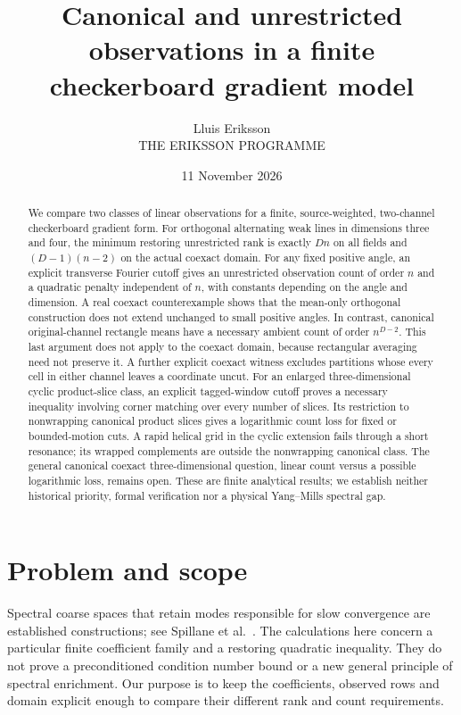 \documentclass[11pt,a4paper]{article}
\title{Canonical and unrestricted observations in a finite checkerboard gradient model}
\author{Lluis Eriksson\\\small THE ERIKSSON PROGRAMME}
\date{11 November 2026}
\begin{document}
\maketitle
\begin{abstract}
We compare two classes of linear observations for a finite, source-weighted,
two-channel checkerboard gradient form. For orthogonal alternating weak lines
in dimensions three and four, the minimum restoring unrestricted rank is
exactly $Dn$ on all fields and $(D-1)(n-2)$ on the actual coexact domain.
For any fixed positive angle, an explicit transverse Fourier cutoff gives
an unrestricted observation count of order $n$ and a quadratic penalty
independent of $n$, with constants depending on the angle and dimension.
A real coexact counterexample shows that the mean-only orthogonal construction
does not extend unchanged to small positive angles. In contrast, canonical
original-channel rectangle means have a necessary ambient count of order
$n^{D-2}$. This last argument does not apply to the coexact domain, because
rectangular averaging need not preserve it. A further explicit coexact witness
excludes partitions whose every cell in either channel leaves a coordinate
uncut. For an enlarged three-dimensional cyclic product-slice class, an explicit
tagged-window cutoff proves a necessary inequality involving corner
matching over every number of slices. Its restriction to nonwrapping
canonical product slices gives a logarithmic count loss for fixed or
bounded-motion cuts. A rapid helical grid in the cyclic extension fails
through a short resonance; its wrapped complements are outside the
nonwrapping canonical class.
The general canonical coexact three-dimensional question, linear count
versus a possible logarithmic loss, remains open. These are finite analytical results;
we establish neither historical priority, formal verification nor a physical
Yang--Mills spectral gap.
\end{abstract}

\section{Problem and scope}
Spectral coarse spaces that retain modes responsible for slow convergence are
established constructions; see Spillane et al.~\cite{spillane2011,spillane2014}.
The calculations here concern a particular finite coefficient family and a
restoring quadratic inequality. They do not prove a preconditioned condition
number bound or a new general principle of spectral enrichment. Our purpose is
to keep the coefficients, observed rows and domain explicit enough to compare
their different rank and count requirements.
\end{document}
